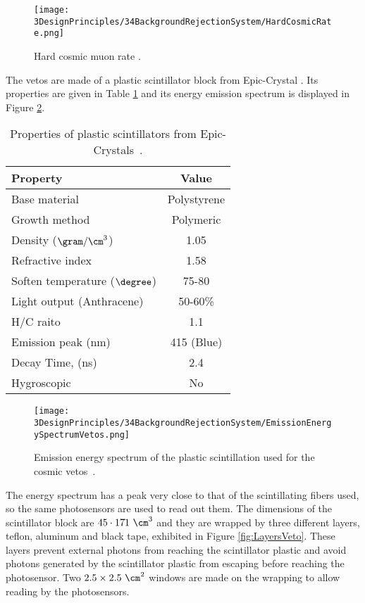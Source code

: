 \begin{figure}[h]
\centering
\texttt{[image: 3DesignPrinciples/34BackgroundRejectionSystem/HardCosmicRate.png]}
\caption{Hard cosmic muon rate \cite{HardCosmicMuonRatePlot}.\label{fig:HardCoscmicRate}}
\end{figure}

The vetos are made of a plastic scintillator block from Epic-Crystal \cite{ScintillatorVeto}. Its properties are given in Table \ref{tab:ParametersScintillatorVeto} and its energy emission spectrum is displayed in Figure \ref{fig:EmissionEnergySpectrumVeto}.

\begin{table}[htbp]
\centering{}%
\begin{tabular}{lc}
\toprule 
Property & Value \tabularnewline
\midrule
\midrule 
Base material & Polystyrene \tabularnewline
Growth method & Polymeric \tabularnewline
Density ($\gram/\cm^3$)& 1.05 \tabularnewline
Refractive index & 1.58 \tabularnewline
Soften temperature ($\degree$) & 75-80 \tabularnewline
Light output (Anthracene) & 50-60\% \tabularnewline
H/C raito & 1.1 \tabularnewline
Emission peak (nm) & 415 (Blue) \tabularnewline
Decay Time, (ns) & 2.4 \tabularnewline
Hygroscopic & No \tabularnewline
\bottomrule
\end{tabular}
\caption{Properties of plastic scintillators from Epic-Crystals~\cite{ScintillatorVeto}.}
\label{tab:ParametersScintillatorVeto}
\end{table}

\begin{figure}[]
\centering
\texttt{[image: 3DesignPrinciples/34BackgroundRejectionSystem/EmissionEnergySpectrumVetos.png]}
\caption{Emission energy spectrum of the plastic scintillation used for the cosmic vetos\label{fig:EmissionEnergySpectrumVeto}~\cite{ScintillatorVeto}.}
\end{figure}

The energy spectrum has a peak very close to that of the scintillating fibers used, so the same photosensors are used to read out them. The dimensions of the scintillator block are $45 \cdot{} 17 \dot{} 1~\cm^3$ and they are wrapped by three different layers, teflon, aluminum and black tape, exhibited in Figure \ref{fig:LayersVeto}. These layers prevent external photons from reaching the scintillator plastic and avoid photons generated by the scintillator plastic from escaping before reaching the photosensor. Two $2.5\times 2.5 ~\cm^2$ windows are made on the wrapping to allow reading by the photosensors.



